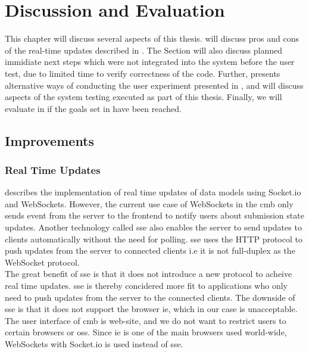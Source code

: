 \chapter{Discussion and Evaluation}
\label{ch:evaluation}
This chapter will discuss several aspects of this thesis.  will discuss pros and cons of the real-time updates described in . The Section will also discuss planned immidiate next steps which were not integrated into the system before the user test, due to limited time to verify correctness of the code. Further,  presents alternative ways of conducting the user experiment presented in , and  will discuss aspects of the system testing executed as part of this thesis. Finally, we will evaluate in  if the goals set in  have been reached.

\section{Improvements}
\label{sec:eval-tech}

\subsection{Real Time Updates}
 describes the implementation of real time updates of data models using Socket.io and WebSockets. However, the current use case of WebSockets in the \gls{cmb} only sends event from the server to the frontend to notify users about submission state updates. Another technology called \gls{sse} \cite{hickson2009} also enables the server to send updates to clients automatically without the need for polling. \gls{sse} uses the HTTP protocol to push updates from the server to connected clients i.e it is not full-duplex as the WebSocket protocol.  \\

The great benefit of \gls{sse} is that it does not introduce a new protocol to acheive real time updates. \gls{sse} is thereby concidered more fit to applications who only need to push updates from the server to the connected clients. The downside of \gls{sse} is that it does not support the browser \gls{ie}, which in our case is unacceptable. The user interface of \gls{cmb} is web-site, and we do not want to restrict users to certain browsers or \glspl{os}. Since \gls{ie} is one of the main browsers used world-wide, WebSockets with Socket.io is used instead of \gls{sse}.  \\

